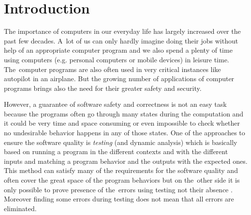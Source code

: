 \documentclass[fleqn,11pt]{ExcelAtFIT} %
\affiliation{*%
  \href{mailto:xhrusk16@stud.fit.vutbr.cz}{xhrusk16@stud.fit.vutbr.cz},
  \textit{Faculty of Information Technology, Brno University of Technology}}
\begin{document}
\startdocument



\section{Introduction}

The importance of computers in our everyday life has largely increased over the past few decades.
A~lot of us can only hardly imagine doing their jobs without help of an appropriate computer program
and we also spend a plenty of time using computers (e.g. personal computers or mobile devices) in leisure time.
The~computer programs are also often used in very critical instances like autopilot in an airplane.
But the growing number of applications of computer programs brings also the need for their greater safety and security.

However, a guarantee of software safety and correctness is not an easy task
because the programs often go through many states during the computation
and it could be very time and space consuming or even impossible to check whether no undesirable behavior
happens in any of those states.
One of the approaches to ensure the software quality is \emph{testing} (and dynamic analysis) which is basically based
on running a program in the different contexts and with the different inputs
and matching a program behavior and the outputs with the expected ones.
This method can satisfy many of the requirements for the software quality and often cover the great space of the program behaviors
but on the~other side it is only possible to prove presence of the~errors using testing not their absence \cite{dijkstra}.
Moreover finding some errors during testing does not mean that all errors are eliminated.
\end{document}
